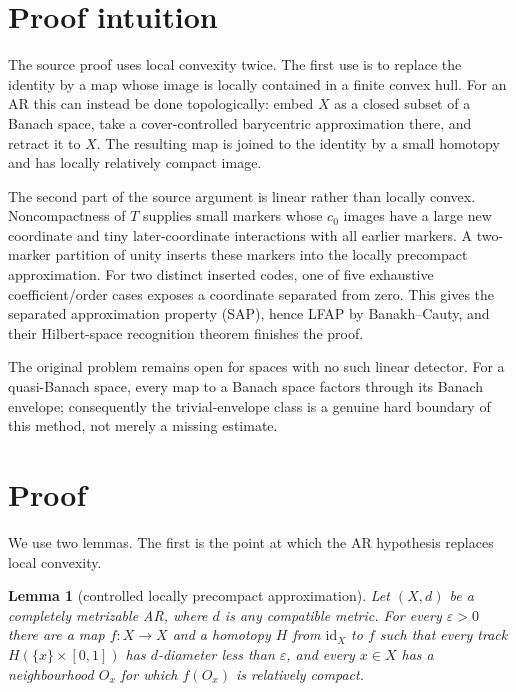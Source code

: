 \documentclass[11pt]{article}
\newtheorem{lemma}[theorem]{Lemma}
\newcommand{\id}{\mathrm{id}}
\begin{document}
\section{\texorpdfstring{\hspace{0.25em}Proof intuition}{Proof intuition}}

The source proof uses local convexity twice.  The first use is to replace the
identity by a map whose image is locally contained in a finite convex hull.
For an AR this can instead be done topologically: embed $X$ as a closed subset
of a Banach space, take a cover-controlled barycentric approximation there,
and retract it to $X$.  The resulting map is joined to the identity by a small
homotopy and has locally relatively compact image.

The second part of the source argument is linear rather than locally convex.
Noncompactness of $T$ supplies small markers whose $c_0$ images have a large
new coordinate and tiny later-coordinate interactions with all earlier
markers.  A two-marker partition of unity inserts these markers into the
locally precompact approximation.  For two distinct inserted codes, one of
five exhaustive coefficient/order cases exposes a coordinate separated from
zero.  This gives the separated approximation property (SAP), hence LFAP by
Banakh--Cauty, and their Hilbert-space recognition theorem finishes the proof.

The original problem remains open for spaces with no such linear detector.
For a quasi-Banach space, every map to a Banach space factors through its
Banach envelope; consequently the trivial-envelope class is a genuine hard
boundary of this method, not merely a missing estimate.

\section{Proof}

We use two lemmas.  The first is the point at which the AR hypothesis replaces
local convexity.

\begin{lemma}[controlled locally precompact approximation]\label{lem:arapprox}
Let $(X,d)$ be a completely metrizable AR, where $d$ is any compatible
metric.  For every $\varepsilon>0$ there are a map $f:X\to X$ and a homotopy
$H$ from $\id_X$ to $f$ such that every track $H(\{x\}\times[0,1])$ has
$d$-diameter less than $\varepsilon$, and every $x\in X$ has a neighbourhood
$O_x$ for which $f(O_x)$ is relatively compact.
\end{lemma}
\end{document}
